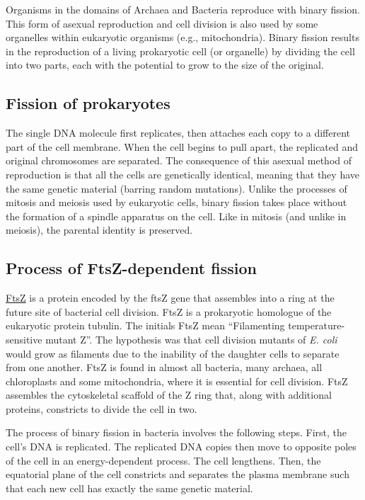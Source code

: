 Organisms in the domains of Archaea and Bacteria reproduce with binary fission. This form of asexual reproduction and cell division is also used by some organelles within eukaryotic organisms (e.g., mitochondria). Binary fission results in the reproduction of a living prokaryotic cell (or organelle) by dividing the cell into two parts, each with the potential to grow to the size of the original.

\hypertarget{fission-of-prokaryotes}{%
\subsection{Fission of prokaryotes}\label{fission-of-prokaryotes}}

The single DNA molecule first replicates, then attaches each copy to a different part of the cell membrane. When the cell begins to pull apart, the replicated and original chromosomes are separated. The consequence of this asexual method of reproduction is that all the cells are genetically identical, meaning that they have the same genetic material (barring random mutations). Unlike the processes of mitosis and meiosis used by eukaryotic cells, binary fission takes place without the formation of a spindle apparatus on the cell. Like in mitosis (and unlike in meiosis), the parental identity is preserved.

\hypertarget{process-of-ftsz-dependent-fission}{%
\subsection{Process of FtsZ-dependent fission}\label{process-of-ftsz-dependent-fission}}

\href{https://en.wikipedia.org/wiki/FtsZ}{FtsZ} is a protein encoded by the ftsZ gene that assembles into a ring at the future site of bacterial cell division. FtsZ is a prokaryotic homologue of the eukaryotic protein tubulin. The initials FtsZ mean ``Filamenting temperature-sensitive mutant Z''. The hypothesis was that cell division mutants of \emph{E. coli} would grow as filaments due to the inability of the daughter cells to separate from one another. FtsZ is found in almost all bacteria, many archaea, all chloroplasts and some mitochondria, where it is essential for cell division. FtsZ assembles the cytoskeletal scaffold of the Z ring that, along with additional proteins, constricts to divide the cell in two.

The process of binary fission in bacteria involves the following steps. First, the cell's DNA is replicated. The replicated DNA copies then move to opposite poles of the cell in an energy-dependent process. The cell lengthens. Then, the equatorial plane of the cell constricts and separates the plasma membrane such that each new cell has exactly the same genetic material.

